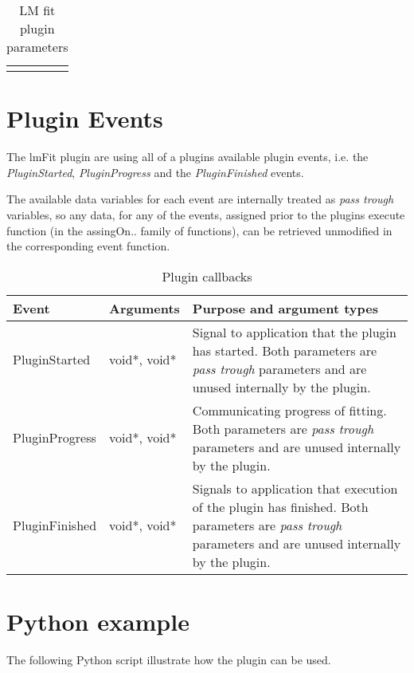 \begin{landscape}
\begin{longtable}{p{4cm} l p{3cm}  p{10cm}}
\hline %
\caption{LM fit plugin parameters} 
\label{table:lmfitPluginParameters} 
\end{longtable}

\end{landscape}

\section{Plugin Events}
The lmFit plugin are using all of a plugins available plugin events, i.e. the \emph{PluginStarted}, \emph{PluginProgress} and the \emph{PluginFinished} events.

The available data variables for each event are internally treated as \emph{pass trough} variables, so any data, for any of the events, assigned prior to 
the plugins execute function (in the assingOn.. family of functions), can be retrieved unmodified in the corresponding event function.

\begin{table}[ht]
\centering %
\begin{tabular}{l l p{9cm}} 

Event & Arguments & Purpose and argument types \\ [0.5ex] %
\hline %
PluginStarted  	& 	void*, void*  & Signal to application that the plugin has started. Both parameters are \emph{pass trough} parameters and are unused internally by the plugin.\\[0.5ex]
PluginProgress	& 	void*, void*  & Communicating progress of fitting. Both parameters are \emph{pass trough} parameters and are unused internally by the plugin. \\[0.5ex]
PluginFinished	& 	void*, void*  & Signals to application that execution of the plugin has finished. Both parameters are \emph{pass trough} parameters and are unused internally by the plugin.\\

\hline %
\end{tabular}
\caption{Plugin callbacks} 
\label{table:lmfitPluginCallBacks} 
\end{table}

\section{Python example}
The following Python script illustrate how the plugin can be used. 

